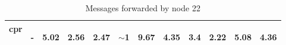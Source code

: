 \documentclass{article}
\begin{document}
\begin{table}[H]
\begin{center}
\begin{tabular}{|c|c|c|c|c|c|c|c|c|c|c|c|}
				    cpr & \begin{footnotesize}-\end{footnotesize} & \begin{footnotesize}5.02\end{footnotesize} & \begin{footnotesize}2.56\end{footnotesize} & \begin{footnotesize}2.47\end{footnotesize} & \begin{footnotesize}$\sim$1\end{footnotesize} & \begin{footnotesize}9.67\end{footnotesize} & \begin{footnotesize}4.35\end{footnotesize} & \begin{footnotesize}3.4\end{footnotesize} & \begin{footnotesize}2.22\end{footnotesize} & \begin{footnotesize}5.08\end{footnotesize} & \begin{footnotesize}4.36\end{footnotesize}\\ \hline
			    \end{tabular}
			\end{center}	
			\caption{Messages forwarded by node 22}
			\label{tab:25F22P1}
		\end{table}	
\end{document}
